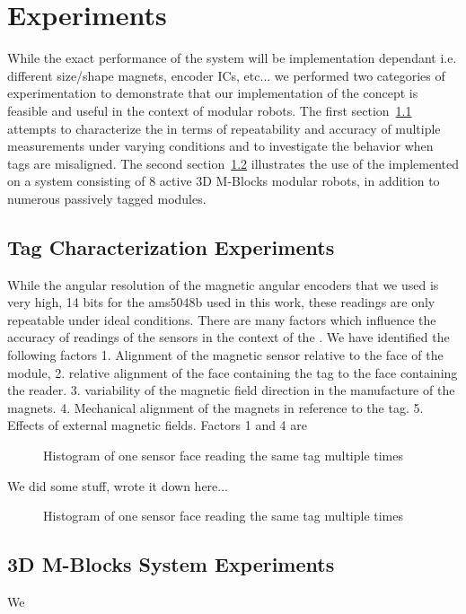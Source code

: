 \section{Experiments}
\label{sec:Experiments}
While the exact performance of the \tagName system will be implementation dependant i.e. different size/shape magnets, encoder ICs, etc... we performed two categories of experimentation to demonstrate that our implementation of the \tagName concept is feasible and useful in the context of modular robots. The first section~\ref{sec:characterize} attempts to characterize the \tagNamePlural in terms of repeatability and accuracy of multiple measurements under varying conditions and to investigate the behavior when tags are misaligned. The second section~\ref{sec:mblocksExperiments} illustrates the use of the \tagNamePlural implemented on a system consisting of 8 active 3D M-Blocks modular robots, in addition to numerous passively tagged modules.

\subsection{Tag Characterization Experiments}
\label{sec:characterize}

While the angular resolution of the magnetic angular encoders that we used is very high, 14 bits for the ams5048b used in this work, these readings are only repeatable under ideal conditions. There are many factors which influence the accuracy of readings of the sensors in the context of the \tagNamePlural. We have identified the following factors 1. Alignment of the magnetic sensor relative to the face of the module, 2. relative alignment of the face containing the tag to the face containing the reader. 3. variability of the magnetic field direction in the manufacture of the magnets. 4. Mechanical alignment of the magnets in reference to the tag. 5. Effects of external magnetic fields.
	Factors 1 and 4 are 
	
\begin{figure}[H]
	
	\caption{Histogram of one sensor face reading the same tag multiple times}
	\label{fig:histogram}
\end{figure}

We did some stuff, wrote it down here...

\begin{figure}[H]
	
	\caption{Histogram of one sensor face reading the same tag multiple times}
	\label{fig:histogram}
\end{figure}

\subsection{3D M-Blocks System Experiments}
\label{sec:mblocksExperiments}

We 
